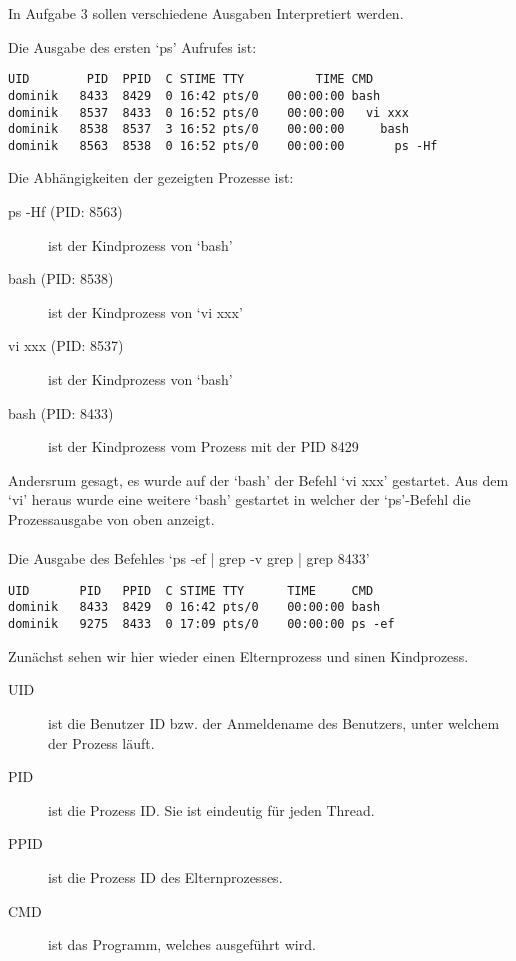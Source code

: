 \documentclass[a4paper]{article}
\begin{document}
In Aufgabe 3 sollen verschiedene Ausgaben Interpretiert werden.

Die Ausgabe des ersten `ps' Aufrufes ist:
\begin{verbatim}
UID        PID  PPID  C STIME TTY          TIME CMD
dominik   8433  8429  0 16:42 pts/0    00:00:00 bash
dominik   8537  8433  0 16:52 pts/0    00:00:00   vi xxx
dominik   8538  8537  3 16:52 pts/0    00:00:00     bash
dominik   8563  8538  0 16:52 pts/0    00:00:00       ps -Hf
\end{verbatim}

Die Abhängigkeiten der gezeigten Prozesse ist:
\begin{description}
\item[ps -Hf (PID: 8563)] ist der Kindprozess von `bash'
\item[bash (PID: 8538)] ist der Kindprozess von `vi xxx'
\item[vi xxx (PID: 8537)] ist der Kindprozess von `bash'
\item[bash (PID: 8433)] ist der Kindprozess vom Prozess mit der PID 8429
\end{description}

Andersrum gesagt, es wurde auf der `bash' der Befehl `vi xxx' gestartet.
Aus dem `vi' heraus wurde eine weitere `bash' gestartet in welcher der `ps'-Befehl
die Prozessausgabe von oben anzeigt.

\paragraph{}
Die Ausgabe des Befehles `ps -ef | grep -v grep | grep 8433'
\begin{verbatim}
UID       PID   PPID  C STIME TTY      TIME     CMD
dominik   8433  8429  0 16:42 pts/0    00:00:00 bash
dominik   9275  8433  0 17:09 pts/0    00:00:00 ps -ef
\end{verbatim}
Zunächst sehen wir hier wieder einen Elternprozess und sinen Kindprozess.	

\begin{description}
\item[UID] ist die Benutzer ID bzw. der Anmeldename des Benutzers, unter welchem der Prozess läuft.
\item[PID] ist die Prozess ID. Sie ist eindeutig für jeden Thread.
\item[PPID] ist die Prozess ID des Elternprozesses.
\item[CMD] ist das Programm, welches ausgeführt wird.
\end{description}
\end{document}
